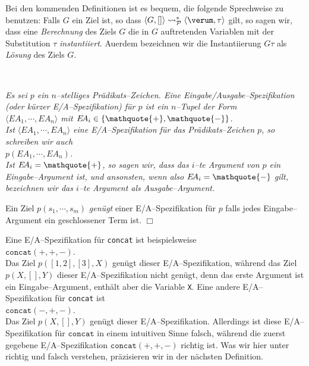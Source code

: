 Bei den kommenden Definitionen ist es bequem, die folgende Sprechweise zu benutzen:
Falls $G$ ein Ziel ist, so dass $\langle G, [] \rangle \leadsto_\mathcal{P}^* \langle \verum, \tau \rangle$ gilt, 
so sagen wir, dass eine \emph{Berechnung} des Ziels $G$ die in $G$ auftretenden Variablen  mit der Substitution 
$\tau$ \emph{instantiiert}.  Au\3erdem bezeichnen wir die Instantiierung $G\tau$ als \emph{L\"{o}sung} des Ziels $G$.

\begin{Definition}[E/A--Spezifikation] \hspace*{\fill} \\
{\em
    Es sei $p$ ein $n$--stelliges Pr\"{a}dikats--Zeichen.  Eine
    \emph{Eingabe/Ausgabe--Spezifikation} (oder k\"{u}rzer E/A--Spezifikation)
     f\"{u}r $p$ ist ein $n$--Tupel der Form \\[0.1cm]
    \hspace*{1.3cm} $\langle E\!A_1, \cdots, E\!A_n \rangle$ \quad     mit $E\!A_i \in \{ \mathquote{+}, \mathquote{-} \}$.  \\[0.1cm]
    Ist $\langle E\!A_1, \cdots, E\!A_n \rangle$ eine E/A--Spezifikation f\"{u}r
    das Pr\"{a}dikats--Zeichen $p$, so schreiben wir auch \\[0.1cm]
    \hspace*{1.3cm} $p( E\!A_1, \cdots, E\!A_n )$. \\[0.1cm]
    Ist $E\!A_i = \mathquote{+}$, so sagen wir, dass das $i$--te Argument von $p$ ein
    \emph{Eingabe--Argument} ist, und ansonsten, wenn also  $E\!A_i = \mathquote{-}$ gilt,
    bezeichnen wir das $i$--te Argument als \emph{Ausgabe--Argument}. 

    Ein Ziel $p(s_1, \cdots, s_m)$ \emph{gen\"{u}gt} einer E/A--Spezifikation
    f\"{u}r $p$ falls jedes Eingabe--Ar\-gu\-ment ein geschlossener Term ist.
 \hspace*{\fill} $\Box$
}   
\end{Definition}


Eine E/A--Spezifikation f\"{u}r \texttt{concat} ist beispielsweise \\[0.1cm]
\hspace*{1.3cm} $\mathtt{concat}(+,+,-)$. \\[0.1cm]
Das Ziel $p([1,2],[3],X)$ gen\"{u}gt dieser E/A--Spezifikation, w\"{a}hrend das Ziel
$p(X,[],Y)$ dieser E/A--Spezifikation nicht gen\"{u}gt, denn das erste Argument
ist ein Eingabe--Argument, enth\"{a}lt aber die Variable \texttt{X}.
Eine andere E/A--Spezifikation f\"{u}r \texttt{concat} ist \\
\hspace*{1.3cm} $\mathtt{concat}(-,+,-)$. \\[0.1cm]
Das Ziel $p(X,[],Y)$ gen\"{u}gt dieser E/A--Spezifikation.
Allerdings ist diese E/A--Spezifikation f\"{u}r  $\mathtt{concat}$ in einem
intuitiven Sinne falsch, w\"{a}hrend die zuerst gegebene E/A--Spezifikation
$\mathtt{concat}(+,+,-)$ richtig ist.  Was wir hier unter richtig und falsch verstehen,
pr\"{a}zisieren wir in der n\"{a}chsten Definition.

